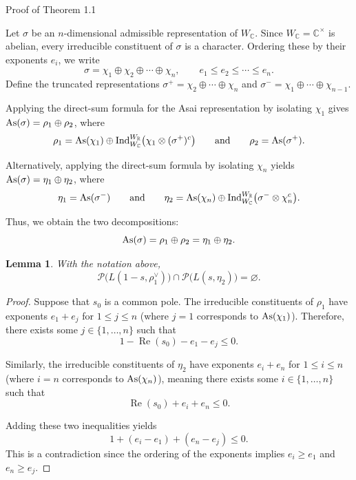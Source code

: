 \documentclass[12pt,reqno]{amsart}
\numberwithin{equation}{section}%
\numberwithin{equation}{subsection}
\newtheorem{lemma}[equation]{Lemma}
\theoremstyle{definition}
\theoremstyle{remark}
\begin{document}
\begin{section}{Proof of Theorem 1.1}\label{s4}

Let $\sigma$ be an $n$-dimensional admissible representation of $W_{\mathbb{C}}$. Since $W_{\mathbb{C}}=\mathbb{C}^{\times}$ is abelian, every irreducible constituent of $\sigma$ is a character. Ordering these by their exponents $e_i$, we write
\[
  \sigma = \chi_1 \oplus \chi_2 \oplus \cdots \oplus \chi_n, \qquad e_1 \leq e_2 \leq \cdots \leq e_n.
\]
Define the truncated representations $\sigma^+ = \chi_2\oplus\cdots\oplus\chi_n$ and $\sigma^- = \chi_1\oplus\cdots\oplus\chi_{n-1}$.

Applying the direct-sum formula for the Asai representation by isolating $\chi_1$ gives ${\rm As}(\sigma) = \rho_1 \oplus \rho_2$, where
\[
  \rho_1 = {\rm As}(\chi_1) \oplus \operatorname{Ind}_{W_{\mathbb{C}}}^{W_{\mathbb{R}}} \bigl(\chi_1\otimes(\sigma^+)^c\bigr) \qquad\text{and}\qquad \rho_2 = {\rm As}(\sigma^+).
\]

Alternatively, applying the direct-sum formula by isolating $\chi_n$ yields ${\rm As}(\sigma) = \eta_1 \oplus \eta_2$, where
\[
  \eta_1 = {\rm As}(\sigma^-) \qquad\text{and}\qquad \eta_2 = {\rm As}(\chi_n) \oplus \operatorname{Ind}_{W_{\mathbb{C}}}^{W_{\mathbb{R}}} \bigl(\sigma^-\otimes\chi_n^c\bigr).
\]

Thus, we obtain the two decompositions:
\[
  {\rm As}(\sigma) = \rho_1 \oplus \rho_2 = \eta_1 \oplus \eta_2.
\]

\begin{lemma}
\label{lem:asai-pole-separation}
With the notation above,
\[
  \mathcal{P}\bigl(L(1-s,\rho_1^\vee)\bigr) \cap \mathcal{P}\bigl(L(s,\eta_2)\bigr) = \varnothing.
\]
\end{lemma}

\begin{proof}
Suppose that $s_0$ is a common pole. The irreducible constituents of $\rho_1$ have exponents $e_1+e_j$ for $1\leq j\leq n$ (where $j=1$ corresponds to ${\rm As}(\chi_1)$). Therefore, there exists some $j\in\{1,\ldots,n\}$ such that
\[
  1-\operatorname{Re}(s_0)-e_1-e_j \leq 0.
\]

Similarly, the irreducible constituents of $\eta_2$ have exponents $e_i+e_n$ for $1\leq i\leq n$ (where $i=n$ corresponds to ${\rm As}(\chi_n)$), meaning there exists some $i\in\{1,\ldots,n\}$ such that
\[
  \operatorname{Re}(s_0)+e_i+e_n \leq 0.
\]

Adding these two inequalities yields
\[
  1+(e_i-e_1)+(e_n-e_j) \leq 0.
\]
This is a contradiction since the ordering of the exponents implies $e_i\geq e_1$ and $e_n\geq e_j$.
\end{proof}


\end{section}
\end{document}
